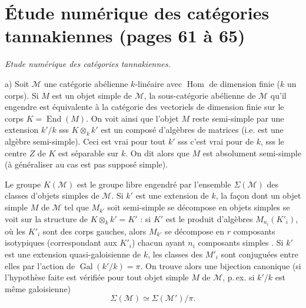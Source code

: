 \documentclass[11pt,a4paper]{article}
\begin{document}
\section*{Étude numérique des catégories tannakiennes (pages 61 à 65)}


\emph{Etude numérique des catégories tannakiennes.}

a) \quad Soit $\mathcal{M}$ une catégorie abélienne $k$-linéaire avec
$\operatorname{Hom}$ de dimension finie ($k$ un corps). Si $M$ est un objet
simple de $\mathcal{M}$, la sous-catégorie abélienne de $\mathcal{M}$ qu'il
engendre est équivalente à la catégorie des vectoriels de dimension finie sur
le corps $K = \operatorname{End}(M)$. On voit ainsi que l'objet $M$ reste
semi-simple par une extension $k'/k$ sss $K \otimes_{k} k'$ est un composé
\struck{\ill{}} d'algèbres de matrices (i.e. est une algèbre semi-simple).
Ceci est vrai \add{\ill{}} pour tout $k'$ sss c'est vrai pour
   de $k$,
 sss le centre  $Z$ de $K$ est séparable sur $k$. On
dit alors que $M$ est absolument semi-simple (à généraliser au cas
est pas supposé simple).

Le groupe $K(\mathcal{M})$ est le groupe libre engendré par l'ensemble
$\Sigma(\mathcal{M})$ des classes d'objets simples de $\mathcal{M}$. Si $k'$
est une extension de $k$, la façon dont un objet simple $M$ de $\mathcal{M}$
tel que $M_{k'}$ soit semi-simple se décompose en objets simples se voit sur
la structure de $K \otimes_{k} k' = K'$ : si $K'$ est le produit d'algèbres
$M_{n_{i}}(K'_{i})$, où les $K'_{i}$ sont des corps gauches,
 alors $M_{k'}$ se décompose en $r$ composants
isotypiques (correspondant aux $K'_{i}$) chacun ayant $n_{i}$ composants
simples . Si $k'$ est une extension quasi-galoisienne de $k$,
les classes des $M'_{i}$ sont conjuguées entre elles par l'action de
$\operatorname{Gal}(k'/k) = \pi$. On trouve alors une bijection canonique
(si l'hypothèse faite est vérifiée pour tout objet simple  $M$ de
$\mathcal{M}$, p.\,ex. si $k'/k$ est même galoisienne)
\[
\Sigma(\mathcal{M}) \simeq \Sigma(\mathcal{M}')/\pi .
\]
\end{document}
